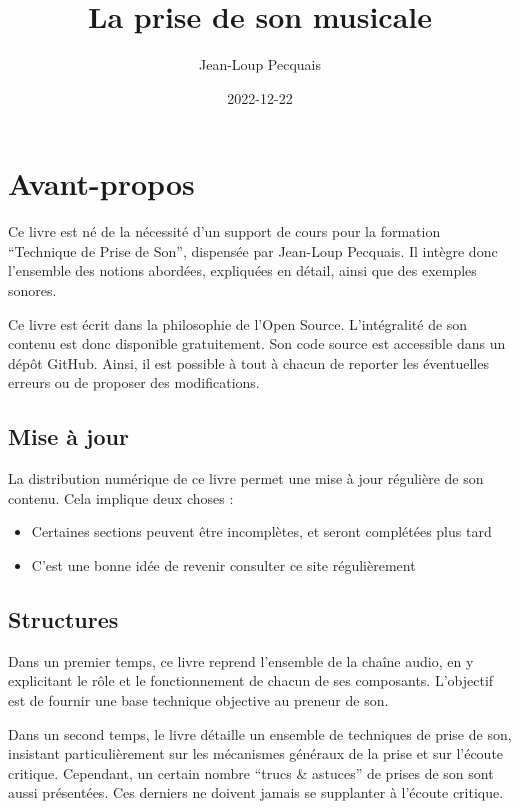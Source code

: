 \documentclass[
]{book}
\title{La prise de son musicale}
\author{Jean-Loup Pecquais}
\date{2022-12-22}
\providecommand{\tightlist}{%
  \setlength{\itemsep}{0pt}\setlength{\parskip}{0pt}}
\begin{document}
\maketitle

{
\setcounter{tocdepth}{1}
\tableofcontents
}
\hypertarget{avant-propos}{%
\chapter{Avant-propos}\label{avant-propos}}

Ce livre est né de la nécessité d'un support de cours pour la formation ``Technique de Prise de Son'', dispensée par Jean-Loup Pecquais. Il intègre donc l'ensemble des notions abordées, expliquées en détail, ainsi que des exemples sonores.

Ce livre est écrit dans la philosophie de l'Open Source. L'intégralité de son contenu est donc disponible gratuitement. Son code source est accessible dans un dépôt GitHub. Ainsi, il est possible à tout à chacun de reporter les éventuelles erreurs ou de proposer des modifications.

\hypertarget{mise-uxe0-jour}{%
\section{Mise à jour}\label{mise-uxe0-jour}}

La distribution numérique de ce livre permet une mise à jour régulière de son contenu. Cela implique deux choses :

\begin{itemize}
\tightlist
\item
  Certaines sections peuvent être incomplètes, et seront complétées plus tard
\item
  C'est une bonne idée de revenir consulter ce site régulièrement
\end{itemize}

\hypertarget{structures}{%
\section{Structures}\label{structures}}

Dans un premier temps, ce livre reprend l'ensemble de la chaîne audio, en y explicitant le rôle et le fonctionnement de chacun de ses composants. L'objectif est de fournir une base technique objective au preneur de son.

Dans un second temps, le livre détaille un ensemble de techniques de prise de son, insistant particulièrement sur les mécanismes généraux de la prise et sur l'écoute critique. Cependant, un certain nombre ``trucs \& astuces'' de prises de son sont aussi présentées. Ces derniers ne doivent jamais se supplanter à l'écoute critique.
\end{document}
